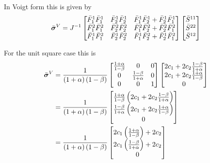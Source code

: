 In Voigt form this is given by
\begin{equation}
  \bar{\boldsymbol{\mathit{\sigma}}}^{V}={J}^{-1}\begin{bmatrix}
  \bar{F}_{1}^{1}\bar{F}_{1}^{1} & \bar{F}_{2}^{1}\bar{F}_{2}^{1} &
  \bar{F}_{1}^{1}\bar{F}_{2}^{1} + \bar{F}_{2}^{1}\bar{F}_{1}^{1} \\
  \bar{F}_{1}^{2}\bar{F}_{1}^{2} & \bar{F}_{2}^{2}\bar{F}_{2}^{2} &
  \bar{F}_{1}^{2}\bar{F}_{2}^{2} + \bar{F}_{2}^{2}\bar{F}_{1}^{2} \\
  \bar{F}_{1}^{1}\bar{F}_{1}^{2} & \bar{F}_{2}^{1}\bar{F}_{2}^{2} &
  \bar{F}_{1}^{1}\bar{F}_{2}^{2} + \bar{F}_{2}^{1}\bar{F}_{1}^{2}
  \end{bmatrix}\begin{bmatrix}
    \bar{S}^{11} \\
    \bar{S}^{22} \\
    \bar{S}^{12}
  \end{bmatrix}
\end{equation}

For the unit square case this is
\begin{equation}
  \begin{split}
    \bar{\boldsymbol{\mathit{\sigma}}}^{V}&=\dfrac{1}{\left( 1+\alpha \right)\left( 1-\beta \right)}\begin{bmatrix}
      \frac{1+\alpha}{1-\beta} & 0 & 0 \\
      0 & \frac{1-\beta}{1+\alpha} & 0 \\
      0 & 0 & 1
    \end{bmatrix}\begin{bmatrix}
      2c_{1}+2c_{2}\frac{1-\beta}{1+\alpha} \\
      2c_{1}+2c_{2}\frac{1+\alpha}{1-\beta} \\
      0
    \end{bmatrix} \\
    &=\dfrac{1}{\left( 1+\alpha \right)\left( 1-\beta \right)}\begin{bmatrix}
      \frac{1+\alpha}{1-\beta}\left( 2c_{1}+2c_{2}\frac{1-\beta}{1+\alpha} \right) \\
      \frac{1-\beta}{1+\alpha}\left( 2c_{1}+2c_{2}\frac{1+\alpha}{1-\beta} \right) \\
      0
    \end{bmatrix} \\
    &=\dfrac{1}{\left( 1+\alpha \right)\left( 1-\beta \right)}\begin{bmatrix}
      2c_{1}\left( \frac{1+\alpha}{1-\beta} \right)+2c_{2} \\
      2c_{1}\left( \frac{1-\beta}{1+\alpha} \right)+2c_{2} \\
      0
    \end{bmatrix}
  \end{split}
\end{equation}

